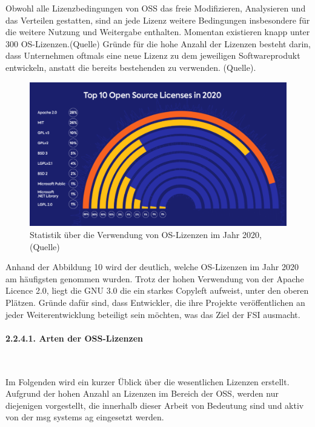Obwohl alle Lizenzbedingungen von OSS das freie Modifizieren, Analysieren und das Verteilen gestatten, sind an jede Lizenz weitere Bedingungen insbesondere für die weitere Nutzung und Weitergabe enthalten. Momentan existieren knapp unter 300 OS-Lizenzen.(Quelle) Gründe für die hohe Anzahl der Lizenzen besteht darin, dass Unternehmen oftmals eine neue Lizenz zu dem jeweiligen Softwareprodukt entwickeln, anstatt die bereits bestehenden zu verwenden. (Quelle). 

\begin{figure}[h]
    \centering
    \includegraphics[scale=0.35]{Bilder/Statistik Verwendung OSS.png}
    \caption{Statistik über die Verwendung von OS-Lizenzen im Jahr 2020, (Quelle)}
\end{figure}

Anhand der Abbildung 10 wird der deutlich, welche OS-Lizenzen im Jahr 2020 am häufigsten genommen wurden. Trotz der hohen Verwendung von der Apache Licence 2.0, liegt die GNU 3.0 die ein starkes Copyleft aufweist, unter den oberen Plätzen. Gründe dafür sind, dass Entwickler, die ihre Projekte veröffentlichen an jeder Weiterentwicklung beteiligt sein möchten, was das Ziel der FSI ausmacht. 

\paragraph{2.2.4.1. Arten der OSS-Lizenzen} $~$

Im Folgenden wird ein kurzer Üblick über die wesentlichen Lizenzen erstellt. Aufgrund der hohen Anzahl an Lizenzen im Bereich der OSS, werden nur diejenigen vorgestellt, die innerhalb dieser Arbeit von Bedeutung sind und aktiv von der msg systems ag eingesetzt werden. 

